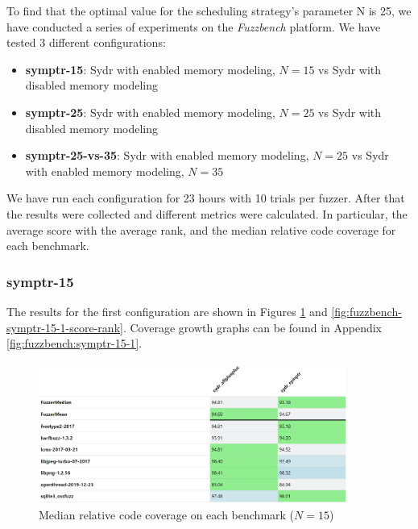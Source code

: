 To find that the optimal value for the scheduling strategy's parameter N is 25, we have conducted a series of experiments on the \textit{Fuzzbench} platform. We have tested 3 different configurations:

\begin{itemize}
    \item \textbf{symptr-15}: Sydr with enabled memory modeling, $N=15$ vs Sydr with disabled memory modeling
    \item \textbf{symptr-25}: Sydr with enabled memory modeling, $N=25$ vs Sydr with disabled memory modeling
    \item \textbf{symptr-25-vs-35}: Sydr with enabled memory modeling, $N=25$ vs Sydr with enabled memory modeling, $N=35$
\end{itemize}

We have run each configuration for 23 hours with 10 trials per fuzzer. After that the results were collected and different metrics were calculated. In particular, the average score with the average rank, and the median relative code coverage for each benchmark.

\subsubsection{symptr-15}

The results for the first configuration are shown in Figures \ref{fig:fuzzbench-symptr-15-1-coverage} and \ref{fig:fuzzbench-symptr-15-1-score-rank}. Coverage growth graphs can be found in Appendix \ref{fig:fuzzbench:symptr-15-1}.

\begin{figure}[h]
    \centering
    \includegraphics[width=0.9\textwidth]{assets/fuzzbench/symptr-15-1/median-relative-code-coverage-on-each-benchmark.png}
    \caption{Median relative code coverage on each benchmark ($N=15$)}
    \label{fig:fuzzbench-symptr-15-1-coverage}
\end{figure}

